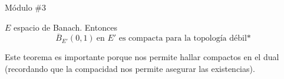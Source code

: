 
\renewcommand{\catnum}{\theNPclase \ No Presencial}%
\renewcommand{\fecha}{01 de junio de 2020}


Módulo \#3

\begin{thm}
$E$ espacio de Banach. Entonces
\begin{equation*}
    \overline{B}_{E'}(0, 1)\ \text{en $E'$ es compacta para la topología débil*}
\end{equation*}
\end{thm}

Este teorema es importante porque nos permite hallar compactos en el dual (recordando que la compacidad nos permite asegurar las existencias).

